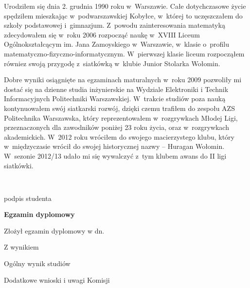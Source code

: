 \begin{titlepage}
    \indent
    Urodziłem się dnia 2. grudnia 1990 roku w~Warszawie. Całe dotychczasowe życie spędziłem mieszkając w~podwarszawskiej Kobyłce, w~której to uczęszczałem do szkoły podstawowej i~gimnazjum. Z~powodu zainteresowania matematyką zdecydowałem się w~roku 2006 rozpocząć naukę w~XVIII Liceum Ogólnokształcącym im. Jana Zamoyskiego w~Warszawie, w~klasie o~profilu matematyczno-fizyczno-informatycznym. W~pierwszej klasie liceum rozpocząłem równiez swoją przygodę z~siatkówką w~klubie Junior Stolarka Wołomin.
    \par
Dobre wyniki osiągnięte na egzaminach maturalnych w~roku 2009 pozwoliły mi dostać się na dzienne studia inżynierskie na Wydziale Elektroniki i Technik Informacyjnych Politechniki Warszawskiej.
W~trakcie studiów poza nauką kontynuowałem swój siatkarski rozwój, dzięki czemu trafiłem do zespołu AZS Politechnika Warszawska, który reprezentowałem w~rozgrywkach Młodej Ligi, przeznaczonych dla zawodników poniżej 23 roku życia, oraz w~rozgrywkach akademickich. W~2012 roku wróciłem do swojego macierzystego klubu, który w~międzyczasie wrócił do swojej historycznej nazwy -- Huragan Wołomin. W~sezonie 2012/13 udało mi się wywalczyć z~tym klubem awans do II ligi siatkówki.


    \par
    \vspace{2\baselineskip}
    \hfill\parbox{15em}{{\small\dotfill}\\[-.3ex]
    \centerline{\footnotesize podpis studenta}}\par
    \vspace{3\baselineskip}
    \begin{center}
 	{\large\bfseries Egzamin dyplomowy} \par\bigskip\bigskip
    \end{center}
    \par\noindent\vspace{1.5\baselineskip}
    Złożył egzamin dyplomowy w dn. \dotfill
    \par\noindent\vspace{1.5\baselineskip}
    Z wynikiem \dotfill
    \par\noindent\vspace{1.5\baselineskip}
    Ogólny wynik studiów \dotfill
    \par\noindent\vspace{1.5\baselineskip}
    Dodatkowe wnioski i uwagi Komisji \dotfill
    \par\noindent\vspace{1.5\baselineskip}
    \dotfill


\end{titlepage}
